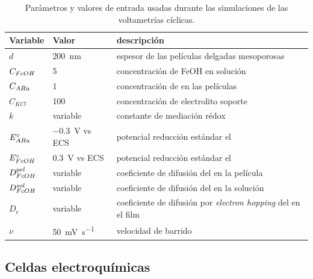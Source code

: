 	    	\begin{table}[hb!]
	 	    \caption[Parámetros de las simulaciones]{Parámetros y valores de entrada usadas durante las simulaciones de las voltametrías cíclicas.}
	 	    \begin{tabular}{>{\raggedright\arraybackslash}m{1.4cm}>{\centering\arraybackslash}m{2.8cm}>{\raggedright\arraybackslash}m{6.7cm}} 
	 	    \toprule
	 	    Variable  & 	Valor  &   descripción      \\ \midrule
	 	    $d$  	  &  \hspace{-5mm} \SI{200}{nm}	& 	   espesor de las películas delgadas mesoporosas 	    \\ \midrule
	 	    $C_{\fc}$  & \SI{5}{\milli\Molar}  & concentración de FeOH en solución    \\ \midrule
	 	    $C_{\ru}$ & \SI{1}{\Molar}  & concentración de \ru\space en las películas    \\ \midrule
	 	    $C_{KCl}$ & \hspace{-5mm}  \SI{100}{\milli\Molar}  & concentración de electrolito soporte    \\ \midrule
	 	    $k$ 		   & variable 	 & 	constante de mediación rédox    \\ \midrule
	 	    $E^\circ_{\ru}$  & \hspace{-3mm}\SI{-0.3}{\volt} vs ECS & potencial reducción estándar el \ru \\ \midrule
	 	    $E^\circ_{\fc}$  & \SI{0.3}{\volt} vs ECS & potencial reducción estándar el \fc \\ \midrule
	 	    $D_{\fc}^{pel} $  & variable & coeficiente de difusión del \fc\space en la película \\ \midrule
	 	    $D_{\fc}^{sol} $  & variable & coeficiente de difusión del \fc\space en la solución \\ \midrule
	 	    $D_{e}$  & variable & coeficiente de difusión por \textit{electron hopping }del \ru\space en el film \\ \midrule
	 	    $\nu$    & \hspace{3.5mm} \SI{50}{\milli\volt\per\second}  &  velocidad de barrido \\
	 	     \bottomrule
			\end{tabular}
			\label{tabla:simulacion}
			\end{table}	  
			
	 \subsection{Celdas electroquímicas}\label{sec:celdas_eq}	

